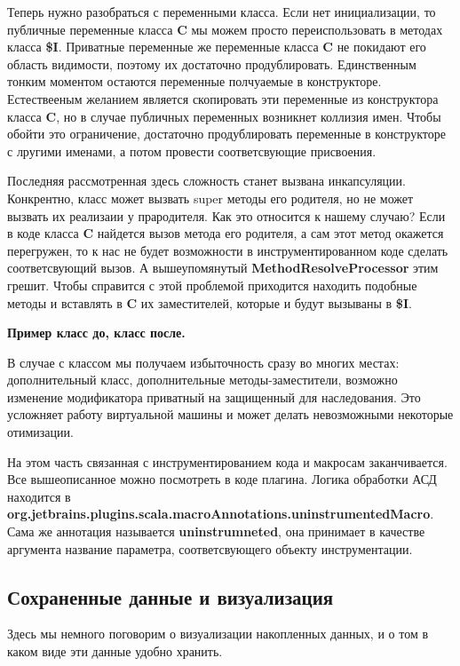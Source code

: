 Теперь нужно разобраться с переменными класса.
Если нет инициализации, то публичные переменные класса \textbf{C} мы можем
просто переиспользовать в методах класса \textbf{\$I}.
Приватные переменные же переменные класса \textbf{C} не покидают его область
видимости, поэтому их достаточно продублировать.
Единственным тонким моментом остаются переменные полчуаемые в конструкторе.
Естествееным желанием является скопировать эти переменные из конструктора
класса \textbf{C}, но в случае публичных переменных возникнет коллизия имен.
Чтобы обойти это ограничение, достаточно продублировать переменные в конструкторе
с лругими именами, а потом провести соответсвующие присвоения.

Последняя рассмотренная здесь сложность станет вызвана инкапсуляции.
Конкрентно, класс может вызвать super методы его родителя, но не может вызвать
их реализаии у прародителя.
Как это относится к нашему случаю?
Если в коде класса \textbf{C} найдется вызов метода его родителя,
а сам этот метод окажется перегружен, то к нас не будет возможности в
инструментированном коде сделать соответсвующий вызов.
А вышеупомянутый \textbf{MethodResolveProcessor} этим грешит.
Чтобы справится с этой проблемой приходится находить подобные методы и
вставлять в \textbf{C} их заместителей, которые и будут вызываны в \textbf{\$I}.

\textbf{Пример класс до, класс после.}

В случае с классом мы получаем избыточность сразу во многих местах:
дополнительный класс, дополнительные методы-заместители, возможно изменение
модификатора приватный на защищенный для наследования.
Это усложняет работу виртуальной машины и может делать невозможными некоторые
отимизации.

На этом часть связанная с инструментированием кода и макросам заканчивается.
Все вышеописанное можно посмотреть в коде плагина.
Логика обработки АСД находится в
\textbf{org.jetbrains.plugins.scala.macroAnnotations.uninstrumentedMacro}.
Сама же аннотация называется \textbf{uninstrumneted}, она принимает в качестве
аргумента название параметра, соответсвующего объекту инструментации.

\subsection{Сохраненные данные и визуализация}
\label{sec:data}

Здесь мы немного поговорим о визуализации накопленных данных,
и о том в каком виде эти данные удобно хранить.

